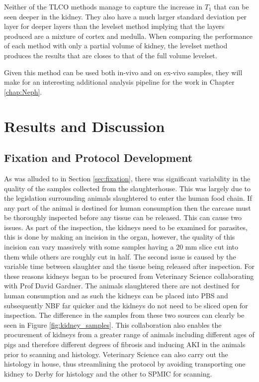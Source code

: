 Neither of the \ac{TLCO} methods manage to capture the increase in $T_1$ that can be seen deeper in the kidney. They also have a much larger standard deviation per layer for deeper layers than the levelset method implying that the layers produced are a mixture of cortex and medulla. When comparing the performance of each method with only a partial volume of kidney, the levelset method produces the results that are closes to that of the full volume levelset.

Given this method can be used both in-vivo and on ex-vivo samples, they will make for an interesting additional analysis pipeline for the work in Chapter \ref{chap:Neph}.

\newpage
\section{Results and Discussion}
\label{sec:neph_results}

\subsection{Fixation and Protocol Development}
As was alluded to in Section \ref{sec:fixation}, there was significant variability in the quality of the samples collected from the slaughterhouse. This was largely due to the legislation surrounding animals slaughtered to enter the human food chain. If any part of the animal is destined for human consumption then the carcase must be thoroughly inspected before any tissue can be released. This can cause two issues. As part of the inspection, the kidneys need to be examined for parasites, this is done by making an incision in the organ, however, the quality of this incision can vary massively with some samples having a 20 mm slice cut into them while others are roughly cut in half. The second issue is caused by the variable time between slaughter and the tissue being released after inspection. For these reasons kidneys began to be procured from Veterinary Science collaborating with Prof David Gardner. The animals slaughtered there are not destined for human consumption and as such the kidneys can be placed into \ac{PBS} and subsequently \ac{NBF} far quicker and the kidneys do not need to be sliced open for inspection. The difference in the samples from these two sources can clearly be seen in Figure \ref{fig:kidney_samples}. This collaboration also enables the procurement of kidneys from a greater range of animals including different ages of pigs and therefore different degrees of fibrosis and inducing \ac{AKI} in the animals prior to scanning and histology. Veterinary Science can also carry out the histology in house, thus streamlining the protocol by avoiding transporting one kidney to Derby for histology and the other to \ac{SPMIC} for scanning.


